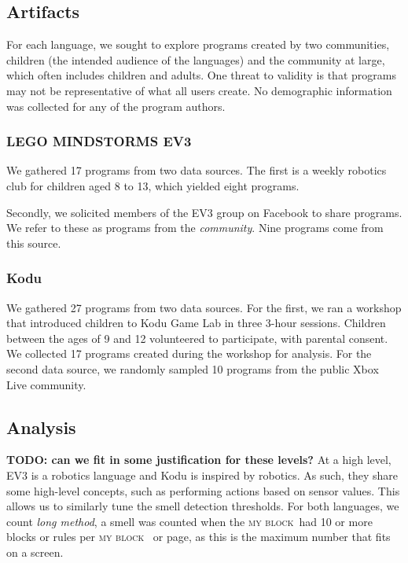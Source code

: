 \documentclass[conference]{IEEEtran}
\newcommand{\ms}{LEGO MINDSTORMS EV3}
\newcommand{\mb}{\textsc{my block}}
\newcommand{\todo}[1]{\textbf{#1}}
\begin{document}
\subsection{Artifacts}
For each language, we sought to explore programs created by two communities, children (the intended audience of the languages) and the community at large, which often includes children and adults. 
One threat to validity is that programs may not be representative of what all users create. 
No demographic information was collected for any of the program authors. 

\subsubsection{\ms}
We  gathered 17 programs from two data sources. The first is a weekly robotics club for children aged 8 to 13, which yielded eight programs. 

Secondly, we solicited members of the EV3 group on Facebook to share programs. We refer to these as programs from the \emph{community}. Nine programs come from this source. 


\subsubsection{Kodu}
We gathered 27  programs from two data sources. 
For the first, we ran a workshop that introduced children to Kodu Game Lab in three 3-hour sessions.  
Children between the ages of 9 and 12 volunteered to participate, with parental consent. We collected 17 programs created during the workshop for analysis. 
For the second data source, we randomly sampled 10 programs from the public Xbox Live community. 



\subsection{Analysis}
\todo{TODO: can we fit in some justification for these levels?} At a high level, EV3 is a robotics language and Kodu is inspired by robotics. As such, they share some high-level concepts, such as performing actions based on sensor values. This allows us to similarly tune the smell detection thresholds. For both languages, we count \emph{long method}, a smell was counted when the \mb~had 10 or more blocks or rules per \mb~ or page, as this is the maximum number that fits on a screen.
\end{document}
